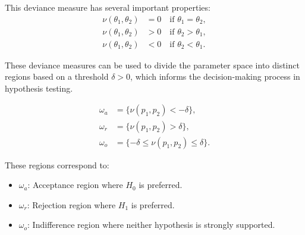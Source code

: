 \documentclass[magisterska, english]{pwr_wmat_praca_dyplomowa}
\theoremstyle{plain}
\numberwithin{theorem}{chapter}
\theoremstyle{definition}
\numberwithin{theorem}{chapter}
\begin{document}
This deviance measure has several important properties:
\begin{align*}
	\nu(\theta_1, \theta_2) &= 0 \quad \text{if } \theta_1 = \theta_2, \\
	\nu(\theta_1, \theta_2) &> 0 \quad \text{if } \theta_2 > \theta_1, \\
	\nu(\theta_1, \theta_2) &< 0 \quad \text{if } \theta_2 < \theta_1.
\end{align*}

These deviance measures can be used to divide the parameter space into distinct regions based on a threshold \(\delta > 0\), which informs the decision-making process in hypothesis testing.

\begin{align*}
	\omega_a &= \{\nu(p_1, p_2) < -\delta\}, \\
	\omega_r &= \{\nu(p_1, p_2) > \delta\}, \\
	\omega_o &= \{-\delta \leq \nu(p_1, p_2) \leq \delta\}.
\end{align*}

These regions correspond to:
\begin{itemize}
	\item \(\omega_a\): Acceptance region where \(H_0\) is preferred.
	\item \(\omega_r\): Rejection region where \(H_1\) is preferred.
	\item \(\omega_o\): Indifference region where neither hypothesis is strongly supported.
\end{itemize}
\end{document}
